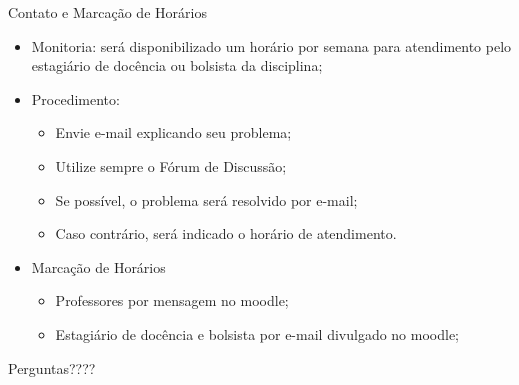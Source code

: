 \documentclass[12pt]{beamer}
\begin{document}
\begin{frame}{Contato e Marcação de Horários}
\begin{itemize}
\item Monitoria: será disponibilizado um horário por semana para atendimento pelo estagiário de docência ou bolsista da disciplina;
\item Procedimento:
\begin{itemize}
\item Envie e-mail explicando seu problema;
\item Utilize sempre o Fórum de Discussão;
\item Se possível, o problema será resolvido por e-mail;
\item Caso contrário, será indicado o horário de atendimento.
\end{itemize}
\item Marcação de Horários
\begin{itemize}
\item Professores por mensagem no moodle;
\item Estagiário de docência e bolsista por e-mail divulgado no moodle;
\end{itemize}
\end{itemize}
\end{frame}

{
\begin{frame}

{\LARGE Perguntas????}

\end{frame}
}
\end{document}
